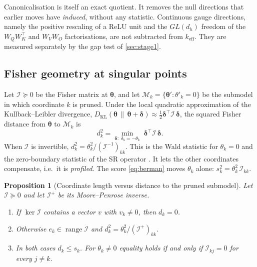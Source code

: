 \documentclass[11pt,a4paper]{article}
\newtheorem{proposition}{Proposition}
\theoremstyle{definition}
\newcommand{\bth}{\boldsymbol\theta}
\newcommand{\bdelta}{\boldsymbol{\delta}}
\newcommand{\Fis}{\mathcal{I}}
\newcommand{\KL}{D_{\mathrm{KL}}}
\DeclareMathOperator{\range}{range}
\newcommand{\keff}{k_{\mathrm{eff}}}
\begin{document}
Canonicalisation is itself an exact quotient. It removes the null directions that
earlier moves have \emph{induced}, without any statistic. Continuous gauge directions,
namely the positive rescaling of a ReLU unit and the $GL(d_h)$ freedom of the
$W_QW_K^{\top}$ and $W_VW_O$ factorisations, are not subtracted from $\keff$. They are
measured separately by the gap test of \cref{sec:stage1}.

\subsection{Fisher geometry at singular points}
\label{sec:singular}

Let $\Fis\succeq0$ be the Fisher matrix at $\bth$, and let
$\mathcal{M}_k=\{\bth':\theta'_k=0\}$ be the submodel in which coordinate $k$ is
pruned. Under the local quadratic approximation of the Kullback--Leibler divergence,
$\KL(\bth\,\|\,\bth+\bdelta)\approx\frac12\bdelta^{\top}\Fis\,\bdelta$, the squared
Fisher distance from $\bth$ to $\mathcal{M}_k$ is
\begin{equation}
d_k^{2}=\min_{\bdelta:\;\delta_k=-\theta_k}\;\bdelta^{\top}\Fis\,\bdelta .
\label{eq:dk}
\end{equation}
When $\Fis$ is invertible, $d_k^{2}=\theta_k^{2}/(\Fis^{-1})_{kk}$. This is the Wald
statistic for $\theta_k=0$ and the zero-boundary statistic of the SR operator
\citep{guidetti2026emergent}. It lets the other coordinates compensate, i.e.\ it is
\emph{profiled}. The score \eqref{eq:berman} moves $\theta_k$ alone:
$s_k^{2}=\theta_k^{2}\,\Fis_{kk}$.

\begin{proposition}[Coordinate length versus distance to the pruned submodel]
\label{prop:singular}
Let $\Fis\succeq0$ and let $\Fis^{+}$ be its Moore--Penrose inverse.
\begin{enumerate}[label=(\alph*)]
\item If $\ker\Fis$ contains a vector $v$ with $v_k\neq0$, then $d_k=0$.
\item Otherwise $e_k\in\range\Fis$ and $d_k^{2}=\theta_k^{2}/(\Fis^{+})_{kk}$.
\item In both cases $d_k\le s_k$. For $\theta_k\neq0$ equality holds if and only if
$\Fis_{kj}=0$ for every $j\neq k$.
\end{enumerate}
\end{proposition}
\end{document}
